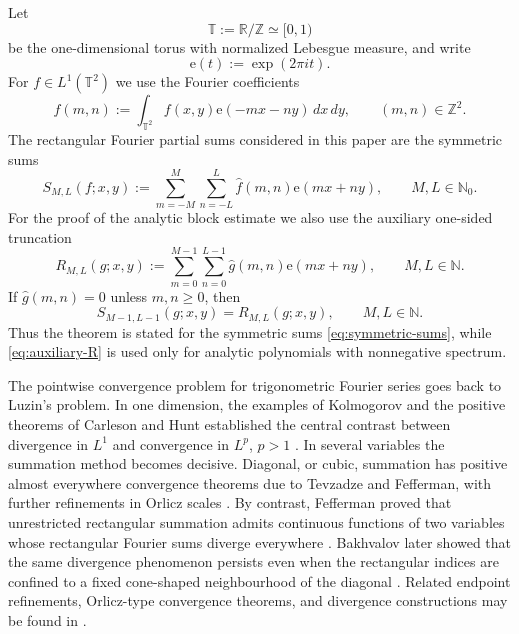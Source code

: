 \documentclass[11pt]{amsart}
\numberwithin{equation}{section}
\begin{document}
Let 
\begin{equation*}
\mathbb{T}:=\mathbb{R}/\mathbb{Z}\simeq [0,1) 
\end{equation*}
be the one-dimensional torus with normalized Lebesgue measure, and write 
\begin{equation*}
\mathrm{e}(t):=\exp(2\pi i t). 
\end{equation*}
For $f\in L^1(\mathbb{T}^2)$ we use the Fourier coefficients 
\begin{equation*}
\widehat f(m,n):=\int_{\mathbb{T}^2} f(x,y)\mathrm{e}(-mx-ny)\,dx\,dy,
\qquad (m,n)\in\mathbb{Z}^2. 
\end{equation*}
The rectangular Fourier partial sums considered in this paper are the
symmetric sums 
\begin{equation}  \label{eq:symmetric-sums}
S_{M,L}(f;x,y):= \sum_{m=-M}^{M}\sum_{n=-L}^{L}\widehat f(m,n)\mathrm{e}%
(mx+ny), \qquad M,L\in\mathbb{N}_0 .
\end{equation}
For the proof of the analytic block estimate we also use the auxiliary
one-sided truncation 
\begin{equation}  \label{eq:auxiliary-R}
R_{M,L}(g;x,y):= \sum_{m=0}^{M-1}\sum_{n=0}^{L-1}\widehat g(m,n)\mathrm{e}%
(mx+ny), \qquad M,L\in\mathbb{N }.
\end{equation}
If $\widehat g(m,n)=0$ unless $m,n\ge0$, then 
\begin{equation}  \label{eq:S-R-relation}
S_{M-1,L-1}(g;x,y)=R_{M,L}(g;x,y), \qquad M,L\in\mathbb{N }.
\end{equation}
Thus the theorem is stated for the symmetric sums \eqref{eq:symmetric-sums},
while \eqref{eq:auxiliary-R} is used only for analytic polynomials with
nonnegative spectrum.

The pointwise convergence problem for trigonometric Fourier series goes back
to Luzin's problem. In one dimension, the examples of Kolmogorov and the
positive theorems of Carleson and Hunt established the central contrast
between divergence in $L^1$ and convergence in $L^p$, $p>1$ \cite%
{Carleson1966,Hunt1968,Kolmogoroff1923,Kolmogoroff1926,Luzin1951}. In
several variables the summation method becomes decisive. Diagonal, or cubic,
summation has positive almost everywhere convergence theorems due to
Tevzadze and Fefferman, with further refinements in Orlicz scales \cite%
{Fefferman1971Convergence,Sjolin1971,Tevzadze1970}. By contrast, Fefferman
proved that unrestricted rectangular summation admits continuous functions
of two variables whose rectangular Fourier sums diverge everywhere \cite%
{Fefferman1971Divergence}. Bakhvalov later showed that the same divergence
phenomenon persists even when the rectangular indices are confined to a
fixed cone-shaped neighbourhood of the diagonal \cite%
{Bakhvalov1997,Bakhvalov2002}. Related endpoint refinements, Orlicz-type
convergence theorems, and divergence constructions may be found in \cite%
{Antonov1996,Antonov2004,Antonov2009,Antonov2014,BakhbukhNikishin1973,
Konyagin1995,Konyagin2000,Sjolin1969,Stein1961,Zygmund1959}.
\end{document}
